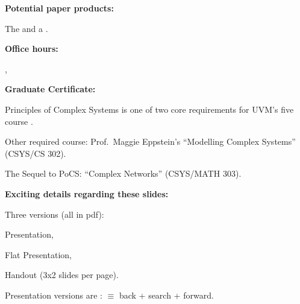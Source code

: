      \officelocation
   
     \myemail
   
     \newline
    {\small
      \wordwikilinklong{\coursewebsite}{\coursewebsite}}
  
     \coursehandle
  
     \coursehashtag
  
  



  \textbf{Potential paper products:}
    
     
      The 
      and a 
      .
    
  

  \textbf{Office hours:}
    
     
      \officehours, \\ \officelocation
    
  

  \textbf{Graduate Certificate:}
    
    
      Principles of Complex Systems is one of two core requirements
      for UVM's five course
      .
    
     Other required course:  Prof.\ Maggie Eppstein's ``Modelling Complex Systems'' (CSYS/CS 302).
    
      The Sequel to PoCS: ``Complex Networks'' (CSYS/MATH 303).
    
  



  \textbf{Exciting details regarding these slides:}

  
    
    
      Three versions (all in pdf): 
      
       
        Presentation,
      
        Flat Presentation,
      
        Handout (3x2 slides per page).
      
    
      Presentation versions are :\newline
      \insertbackfindforwardnavigationsymbol
      $\equiv$
      back + search + forward.
    
